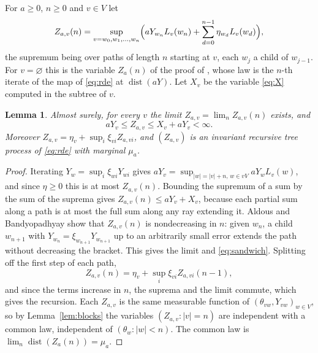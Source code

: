 \documentclass[11pt]{amsart}
\newtheorem{lemma}[theorem]{Lemma}
\theoremstyle{remark}
\newcommand{\dist}{\operatorname{dist}}
\begin{document}
For $a\ge0$, $n\ge 0$ and $v\in V$ let
\[
Z_{a,v}(n)=\sup_{v=w_0,w_1,\dots,w_n}\Bigl(aY_{w_n}L_v(w_n)+\sum_{d=0}^{n-1}\eta_{w_d}L_v(w_d)\Bigr),
\]
the supremum being over paths of length $n$ starting at $v$, each $w_{j}$ a child of
$w_{j-1}$. For $v=\varnothing$ this is the variable $Z_a(n)$ of the proof of
\cite[Corollary~33]{AB}, whose law is the $n$-th iterate of the map of \eqref{eq:rde} at
$\dist(aY)$. Let $X_v$ be the variable \eqref{eq:X} computed in the subtree of $v$.

\begin{lemma}\label{lem:coupling}
Almost surely, for every $v$ the limit $Z_{a,v}=\lim_n Z_{a,v}(n)$ exists, and
\begin{equation}\label{eq:sandwich}
aY_v\le Z_{a,v}\le X_v+aY_v<\infty .
\end{equation}
Moreover $Z_{a,v}=\eta_v+\sup_i\xi_{vi}Z_{a,vi}$, and $(Z_{a,v})$ is an invariant recursive
tree process of \eqref{eq:rde} with marginal $\mu_a$.
\end{lemma}

\begin{proof}
Iterating $Y_w=\sup_i\xi_{wi}Y_{wi}$ gives $aY_v=\sup_{|w|=|v|+n,\,w\in vV}aY_wL_v(w)$, and
since $\eta\ge0$ this is at most $Z_{a,v}(n)$. Bounding the supremum of a sum by the sum of
the suprema gives $Z_{a,v}(n)\le aY_v+X_v$, because each partial sum along a path is at
most the full sum along any ray extending it. Aldous and Bandyopadhyay show that
$Z_{a,v}(n)$ is nondecreasing in $n$: given $w_n$, a child $w_{n+1}$ with
$Y_{w_n}=\xi_{w_{n+1}}Y_{w_{n+1}}$ up to an arbitrarily small error extends the path without
decreasing the bracket. This gives the limit and \eqref{eq:sandwich}. Splitting off the
first step of each path,
\[
Z_{a,v}(n)=\eta_v+\sup_i\xi_{vi}Z_{a,vi}(n-1),
\]
and since the terms increase in $n$, the suprema and the limit commute, which gives the
recursion. Each $Z_{a,v}$ is the same measurable function of
$(\theta_{vw},Y_{vw})_{w\in V}$, so by Lemma~\ref{lem:blocks} the variables
$(Z_{a,v}:|v|=n)$ are independent with a common law, independent of $(\theta_w:|w|<n)$.
The common law is $\lim_n\dist(Z_a(n))=\mu_a$.
\end{proof}
\end{document}
